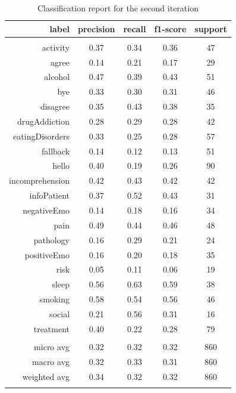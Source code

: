 \documentclass[11pt]{article}
\begin{document}
\begin{table}[htb]
\begin{center}
\begin{tabular}{ |r|c|c|c|c| }
\hline
label  &    precision & recall & f1-score  & support\\ \hline 
\\ \hline 
activity 		& 0.37 &   0.34 &   0.36 & 47\\ \hline 
agree 			& 0.14 &   0.21 &   0.17 & 29\\ \hline 
alcohol 		& 0.47 &   0.39 &   0.43 & 51\\ \hline 
bye 			& 0.33 &   0.30 &   0.31 & 46\\ \hline 
disagree 		& 0.35 &   0.43 &   0.38 & 35\\ \hline 
drugAddiction 	& 0.28 &   0.29 &   0.28 & 42\\ \hline 
eatingDisorders & 0.33 &   0.25 &   0.28 & 57\\ \hline 
fallback 		& 0.14 &   0.12 &   0.13 & 51\\ \hline 
hello 			& 0.40 &   0.19 &   0.26 & 90\\ \hline 
incomprehension & 0.42 &   0.43 &   0.42 & 42\\ \hline 
infoPatient 	& 0.37 &   0.52 &   0.43 & 31\\ \hline 
negativeEmo 	& 0.14 &   0.18 &   0.16 & 34\\ \hline 
pain 			& 0.49 &   0.44 &   0.46 & 48\\ \hline 
pathology 		& 0.16 &   0.29 &   0.21 & 24\\ \hline 
positiveEmo 	& 0.16 &   0.20 &   0.18 & 35\\ \hline 
risk 			& 0.05 &   0.11 &   0.06 & 19\\ \hline 
sleep 			& 0.56 &   0.63 &   0.59 & 38\\ \hline 
smoking 		& 0.58 &   0.54 &   0.56 & 46\\ \hline 
social 			& 0.21 &   0.56 &   0.31 & 16\\ \hline 
treatment 		& 0.40 &   0.22 &   0.28 & 79\\ \hline 
\\ \hline 
micro avg &    0.32 &   0.32 &   0.32 &    860\\ \hline 
macro avg &    0.32 &   0.33 &   0.31 &    860\\ \hline 
weighted avg & 0.34 &   0.32 &   0.32 &    860\\ \hline 
\\ \hline 
\end{tabular}
\caption{Classification report for the second iteration}
\end{center}
\end{table}
\FloatBarrier
\end{document}
